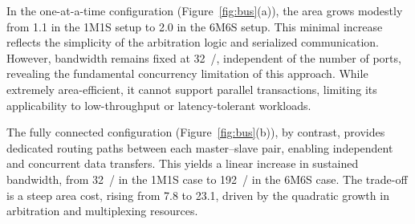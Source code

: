                 \begin{table}[tp]
                    \caption{Comparison of area (kGE) and sustained memory bandwidth (bits/cycle) for different interconnect configurations.}
                    \label{tbl:bus}
                    \centering
                \end{table}
        
                In the one-at-a-time configuration (Figure~\ref{fig:bus}(a)), the area grows modestly from \SI{1.1}{\kilogateequiv} in the 1M1S setup to \SI{2.0}{\kilogateequiv} in the 6M6S setup. This minimal increase reflects the simplicity of the arbitration logic and serialized communication. However, bandwidth remains fixed at \SI{32}{\bit/\cycle}, independent of the number of ports, revealing the fundamental concurrency limitation of this approach. While extremely area-efficient, it cannot support parallel transactions, limiting its applicability to low-throughput or latency-tolerant workloads.
        
                The fully connected configuration (Figure~\ref{fig:bus}(b)), by contrast, provides dedicated routing paths between each master–slave pair, enabling independent and concurrent data transfers. This yields a linear increase in sustained bandwidth, from \SI{32}{\bit/\cycle} in the 1M1S case to \SI{192}{\bit/\cycle} in the 6M6S case. The trade-off is a steep area cost, rising from \SI{7.8}{\kilogateequiv} to \SI{23.1}{\kilogateequiv}, driven by the quadratic growth in arbitration and multiplexing resources.
        
